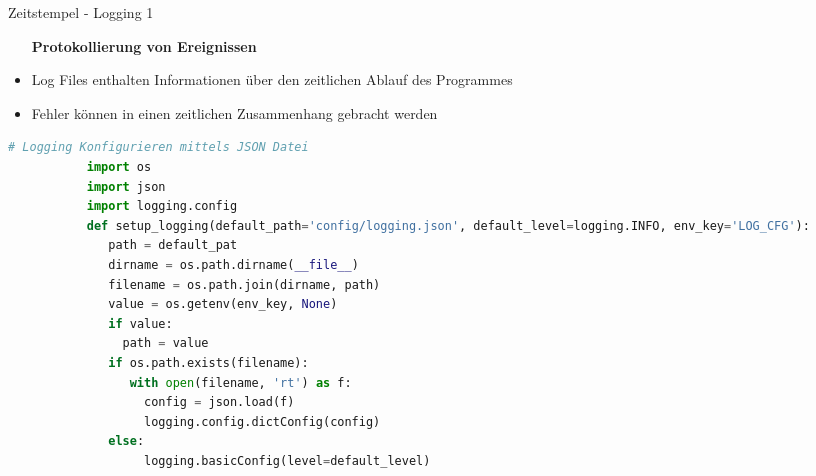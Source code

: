\begin{frame}[fragile]{Zeitstempel - Logging 1}
    \begin{itemize}
        \setlength{\itemindent}{1.9in}
        \item [\textbf{Protokollierung von Ereignissen}]
    \end{itemize}

    \begin{itemize}
              \item Log Files enthalten Informationen über den zeitlichen Ablauf des Programmes
               \item Fehler können in einen zeitlichen Zusammenhang gebracht werden
     \end{itemize}

    \begin{lstlisting}[language=Python, gobble=8]
        # Logging Konfigurieren mittels JSON Datei
           import os
           import json
           import logging.config
           def setup_logging(default_path='config/logging.json', default_level=logging.INFO, env_key='LOG_CFG'):
              path = default_pat
              dirname = os.path.dirname(__file__)
              filename = os.path.join(dirname, path)
              value = os.getenv(env_key, None)
              if value:
                path = value
              if os.path.exists(filename):
                 with open(filename, 'rt') as f:
                   config = json.load(f)
                   logging.config.dictConfig(config)
              else:
                   logging.basicConfig(level=default_level)
        \end{lstlisting}
\end{frame}

